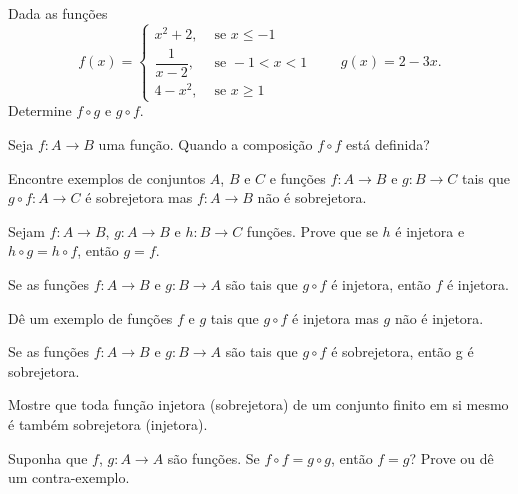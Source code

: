 \documentclass[12pt]{exam}
\begin{document}
    \questao{} Dada as fun\c{c}\~oes
    \[
        f(x) = \begin{cases}
            x^2 + 2, & \mbox{ se } x \le -1\\
            \dfrac{1}{x - 2}, & \mbox{ se } -1 < x < 1\\
            4 - x^2, & \mbox{ se } x \ge 1
        \end{cases} \qquad g(x) = 2 - 3x.
    \]
    Determine $f\circ g$ e $g \circ f$.

    \vspace{.3cm}

    \questao{} Seja $f : A \to B$ uma função. Quando a composição $f \circ f$ está definida?

    \vspace{.3cm}

    \questao{} Encontre exemplos de conjuntos $A$, $B$ e $C$ e funções $f : A \to B$ e $g : B \to C$ tais que $g \circ f : A \to C$ é sobrejetora mas $f : A \to B$ não é sobrejetora.

    \vspace{.3cm}

    \questao{} Sejam $f : A \to B$, $g : A \to B$ e $h : B \to C$ fun\c{c}\~oes. Prove que se $h$ \'e injetora e $h \circ g = h \circ f$, ent\~ao $g = f$.

    \vspace{.3cm}

    \questao{} Se as fun{\c c}{\~o}es $f : A \to B$ e $g : B\to A$ s{\~a}o
    tais que $g\circ f$ {\'e} injetora, ent{\~a}o $f$ {\'e} injetora.

    \vspace{.3cm}

    \questao{} Dê um exemplo de funções $f$ e $g$ tais que $g \circ f$ é injetora mas $g$ não é injetora.

    \vspace{.3cm}

    \questao{} Se as fun{\c c}{\~o}es $f : A \to B$ e $g : B\to A$ s{\~a}o
    tais que $g\circ f$ {\'e} sobrejetora, ent{\~a}o g {\'e} sobrejetora.

    \vspace{.3cm}

    \questao{} Mostre que toda fun{\c c}{\~a}o injetora (sobrejetora) de um conjunto finito em si mesmo {\'e} tamb{\'e}m sobrejetora (injetora).

    \vspace{.3cm}

    \questao{} Suponha que $f$, $g : A \to A$ são funções. Se $f \circ f = g \circ g$, então $f = g$? Prove ou dê um contra-exemplo.
\end{document}

